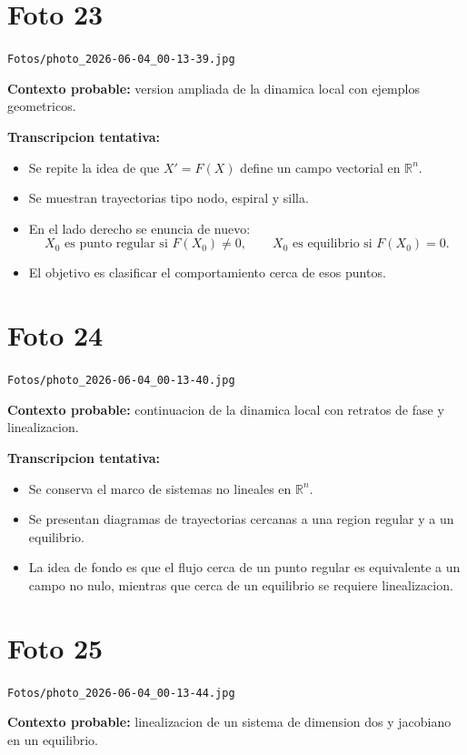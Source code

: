 \documentclass[11pt,letterpaper]{article}
\begin{document}
\section*{Foto 23}
\texttt{Fotos/photo\_2026-06-04\_00-13-39.jpg}

\textbf{Contexto probable:} version ampliada de la dinamica local con ejemplos geometricos.

\textbf{Transcripcion tentativa:}
\begin{itemize}[leftmargin=*]
    \item Se repite la idea de que \(X'=F(X)\) define un campo vectorial en \(\mathbb{R}^n\).
    \item Se muestran trayectorias tipo nodo, espiral y silla.
    \item En el lado derecho se enuncia de nuevo:
    \[
    X_0 \text{ es punto regular si } F(X_0)\neq 0,
    \qquad
    X_0 \text{ es equilibrio si } F(X_0)=0.
    \]
    \item El objetivo es clasificar el comportamiento cerca de esos puntos.
\end{itemize}

\section*{Foto 24}
\texttt{Fotos/photo\_2026-06-04\_00-13-40.jpg}

\textbf{Contexto probable:} continuacion de la dinamica local con retratos de fase y linealizacion.

\textbf{Transcripcion tentativa:}
\begin{itemize}[leftmargin=*]
    \item Se conserva el marco de sistemas no lineales en \(\mathbb{R}^n\).
    \item Se presentan diagramas de trayectorias cercanas a una region regular y a un equilibrio.
    \item La idea de fondo es que el flujo cerca de un punto regular es equivalente a un campo no nulo, mientras que cerca de un equilibrio se requiere linealizacion.
\end{itemize}

\section*{Foto 25}
\texttt{Fotos/photo\_2026-06-04\_00-13-44.jpg}

\textbf{Contexto probable:} linealizacion de un sistema de dimension dos y jacobiano en un equilibrio.
\end{document}
